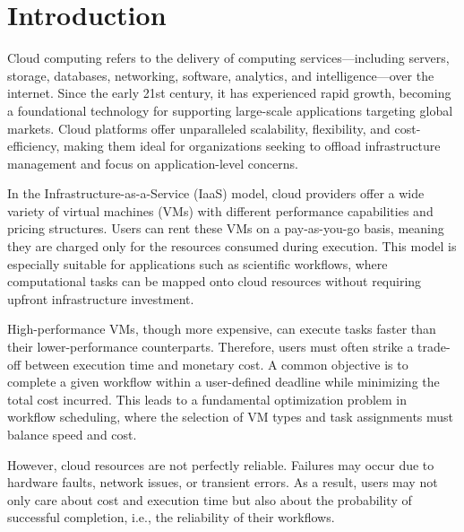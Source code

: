 \documentclass[12pt]{tcc}
\begin{document}
	
	\dcover
	
	\dtables
	
	
	
	
	\justifying
	
	\chapter{Introduction}
	\label{sec_introducao}
	
	
	
	Cloud computing refers to the delivery of computing services—including servers, storage, databases, networking, software, analytics, and intelligence—over the internet. Since the early 21st century, it has experienced rapid growth, becoming a foundational technology for supporting large-scale applications targeting global markets. Cloud platforms offer unparalleled scalability, flexibility, and cost-efficiency, making them ideal for organizations seeking to offload infrastructure management and focus on application-level concerns.
    
	In the Infrastructure-as-a-Service (IaaS) model, cloud providers offer a wide variety of virtual machines (VMs) with different performance capabilities and pricing structures. Users can rent these VMs on a pay-as-you-go basis, meaning they are charged only for the resources consumed during execution. This model is especially suitable for applications such as scientific workflows, where computational tasks can be mapped onto cloud resources without requiring upfront infrastructure investment.
    
	High-performance VMs, though more expensive, can execute tasks faster than their lower-performance counterparts. Therefore, users must often strike a trade-off between execution time and monetary cost. A common objective is to complete a given workflow within a user-defined deadline while minimizing the total cost incurred. This leads to a fundamental optimization problem in workflow scheduling, where the selection of VM types and task assignments must balance speed and cost.
    
	However, cloud resources are not perfectly reliable. Failures may occur due to hardware faults, network issues, or transient errors. As a result, users may not only care about cost and execution time but also about the probability of successful completion, i.e., the reliability of their workflows. 
    
\end{document}
